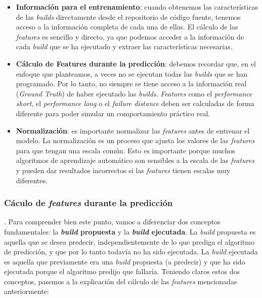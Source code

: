 \begin{itemize}
    \item \textbf{Información para el entrenamiento}: cuando obtenemos las características de las \textit{builds}
    directamente desde el repositorio de código fuente, tenemos acceso a la información completa
    de cada una de ellas. El cálculo de las \textit{features} es sencillo y directo, ya que
    podemos acceder a la información de cada \textit{build} que se ha ejecutado y extraer las
    características necesarias.\\
    
    \item \textbf{Cálculo de Features durante la predicción}: debemos recordar que, en el
    enfoque que planteamos, a veces no se ejecutan todas las \textit{builds} que se han
    programado. Por lo tanto, no siempre se tiene acceso a la información real (\textit{Ground
    Truth}) de haber ejecutado las \textit{builds}. \textit{Features} como el \textit{performance
    short}, el \textit{performance long} o el \textit{failure distance} deben ser calculadas
    de forma diferente para poder simular un comportamiento práctico real.\\

    \item \textbf{Normalización}: es importante normalizar las \textit{features} antes de
    entrenar el modelo. La normalización es un proceso que ajusta los valores de las
    \textit{features} para que tengan una escala común. Esto es importante porque muchos
    algoritmos de aprendizaje automático son sensibles a la escala de las \textit{features} y
    pueden dar resultados incorrectos si las \textit{features} tienen escalas muy diferentes.\\
\end{itemize}

\subsubsection*{Cáculo de \textit{features} durante la predicción}. Para comprender bien este
punto, vamos a diferenciar dos conceptos fundamentales: la \textbf{\textit{build} propuesta} y la
\textbf{\textit{build} ejecutada}. La \textit{build} propuesta es aquella que se desea predecir,
independientemente de lo que prediga el algoritmo de predicción, y que por lo tanto todavía no ha
sido ejecutada. La \textit{build} ejecutada es aquella que previamente era una \textit{build}
propuesta (a predecir) y que ha sido ejecutada porque el algoritmo predijo que fallaría. Teniendo
claros estos dos conceptos, pasemos a la explicación del cálculo de las \textit{features}
mencionadas anteriormente:


